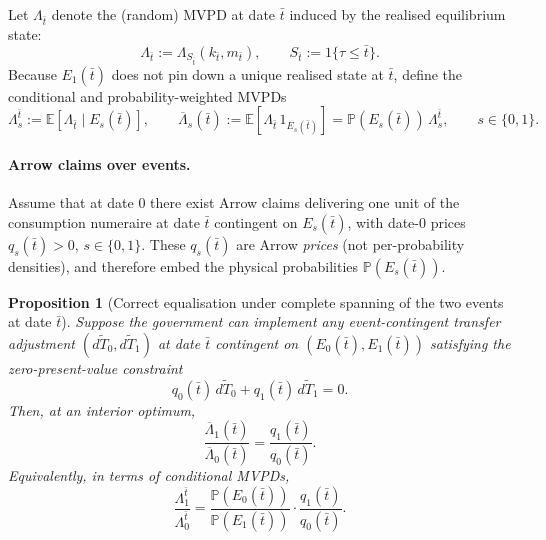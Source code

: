 \documentclass{article}
\newtheorem{proposition}{Proposition}
\begin{document}
Let $\Lambda_{\bar t}$ denote the (random) MVPD at date $\bar t$ induced by the realised equilibrium state:
\begin{equation}
\label{eq:random_mvpf_at_tbar}
\Lambda_{\bar t}:=\Lambda_{S_{\bar t}}(k_{\bar t},m_{\bar t}),
\qquad
S_{\bar t}:=1\{\tau\le \bar t\}.
\end{equation}
Because $E_1(\bar t)$ does not pin down a unique realised state at $\bar t$, define the conditional and probability-weighted MVPDs
\begin{equation}
\label{eq:conditional_weighted_mvpf}
\Lambda^{\bar t}_s := \mathbb E\!\left[\Lambda_{\bar t}\mid E_s(\bar t)\right],
\qquad
\overline\Lambda_s(\bar t):=\mathbb E\!\left[\Lambda_{\bar t}\,1_{E_s(\bar t)}\right]
=\mathbb P(E_s(\bar t))\,\Lambda^{\bar t}_s,
\qquad s\in\{0,1\}.
\end{equation}

\paragraph{Arrow claims over events.}
Assume that at date $0$ there exist Arrow claims delivering one unit of the consumption numeraire at date $\bar t$ contingent on $E_s(\bar t)$, with date-$0$ prices $q_s(\bar t)>0$, $s\in\{0,1\}$. These $q_s(\bar t)$ are Arrow \emph{prices} (not per-probability densities), and therefore embed the physical probabilities $\mathbb P(E_s(\bar t))$.

\begin{proposition}[Correct equalisation under complete spanning of the two events at date $\bar t$]
\label{prop:event_spanning}
Suppose the government can implement any event-contingent transfer adjustment $(d\widetilde T_0,d\widetilde T_1)$ at date $\bar t$ contingent on $(E_0(\bar t),E_1(\bar t))$ satisfying the zero-present-value constraint
\begin{equation}
\label{eq:zero_pv_event_transfer}
q_0(\bar t)\, d\widetilde T_0 + q_1(\bar t)\, d\widetilde T_1 = 0.
\end{equation}
Then, at an interior optimum,
\begin{equation}
\label{eq:weighted_mvpf_equals_prices}
\frac{\overline\Lambda_1(\bar t)}{\overline\Lambda_0(\bar t)}=\frac{q_1(\bar t)}{q_0(\bar t)}.
\end{equation}
Equivalently, in terms of conditional MVPDs,
\begin{equation}
\label{eq:conditional_mvpf_ratio}
\frac{\Lambda^{\bar t}_1}{\Lambda^{\bar t}_0}
=
\frac{\mathbb P(E_0(\bar t))}{\mathbb P(E_1(\bar t))}\cdot \frac{q_1(\bar t)}{q_0(\bar t)}.
\end{equation}
\end{proposition}
\end{document}
